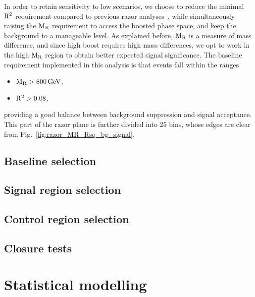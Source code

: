 In order to retain sensitivity to low \ETm scenarios, we choose to reduce the minimal $\mathrm{R^2}$
requirement compared to previous razor
analyses~\cite{Chatrchyan:2011ek,razorPRL,Chatrchyan:2014goa}, while simultaneously raising
the $\mathrm{M_R}$ requirement to access the boosted phase space, and keep the background to a
manageable level.
As explained before, $\mathrm{M_R}$ is a measure of mass difference, and since high boost requires high mass
differences, we opt to work in the high $\mathrm{M_R}$ region to obtain better expected signal
significance. 
The baseline requirement implemented in this analysis is that events fall within the ranges 
\begin{itemize}
\item $\mathrm{M_R} > 800\,\text{Ge\hspace{-.08em}V}$, 
\item $\mathrm{R^2} > 0.08$,
\end{itemize}
providing a good balance between background suppression and signal acceptance. 
This part of the razor plane is further divided into 25 bins, whose edges are clear from
Fig.~\ref{fig:razor_MR_Rsq_bg_signal}.

\subsection{Baseline selection \label{sec:boost_baseline_selection}}



\subsection{Signal region selection \label{sec:boost_signal_selection}}



\subsection{Control region selection \label{sec:boost_control_selection}}



\FloatBarrier
\subsection{Closure tests \label{sec:boost_closure_tests}}




\section{Statistical modelling \label{sec:boost_likelihood}}

